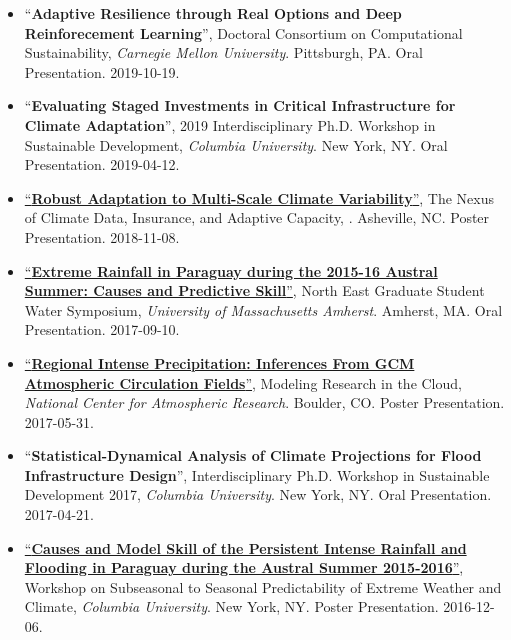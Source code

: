 \documentclass[10pt,oneside]{article}
\begin{document}
\begin{itemize}[label={}]
  \item \enquote{\textbf{Adaptive Resilience through Real Options and Deep Reinforecement Learning}}, Doctoral Consortium on Computational Sustainability,  \textit{Carnegie Mellon University}. Pittsburgh,  PA. Oral Presentation. 2019-10-19.

  \item \enquote{\textbf{Evaluating Staged Investments in Critical Infrastructure for Climate Adaptation}}, 2019 Interdisciplinary Ph.D. Workshop in Sustainable Development,  \textit{Columbia University}. New York, NY. Oral Presentation. 2019-04-12.

  \item \href{https://doi.org/10.6084/m9.figshare.8277002.v1}{\enquote{\textbf{Robust Adaptation to Multi-Scale Climate Variability}}}, The Nexus of Climate Data, Insurance, and Adaptive Capacity,  . Asheville, NC. Poster Presentation. 2018-11-08.

  \item \href{https://doi.org/10.6084/m9.figshare.8277128.v2}{\enquote{\textbf{Extreme Rainfall in Paraguay during the 2015-16 Austral Summer: Causes and Predictive Skill}}}, North East Graduate Student Water Symposium,  \textit{University of Massachusetts Amherst}. Amherst, MA. Oral Presentation. 2017-09-10.

  \item \href{https://doi.org/10.6084/m9.figshare.8277167.v1}{\enquote{\textbf{Regional Intense Precipitation: Inferences From GCM Atmospheric Circulation Fields}}}, Modeling Research in the Cloud,  \textit{National Center for Atmospheric Research}. Boulder, CO. Poster Presentation. 2017-05-31.

  \item \enquote{\textbf{Statistical-Dynamical Analysis of Climate Projections for Flood Infrastructure Design}}, Interdisciplinary Ph.D. Workshop in Sustainable Development 2017,  \textit{Columbia University}. New York, NY. Oral Presentation. 2017-04-21.

  \item \href{https://doi.org/10.13140/RG.2.2.20146.30406}{\enquote{\textbf{Causes and Model Skill of the Persistent Intense Rainfall and Flooding in Paraguay during the Austral Summer 2015-2016}}}, Workshop on Subseasonal to Seasonal Predictability of Extreme Weather and Climate,  \textit{Columbia University}. New York, NY. Poster Presentation. 2016-12-06.

\end{itemize}
\end{document}
